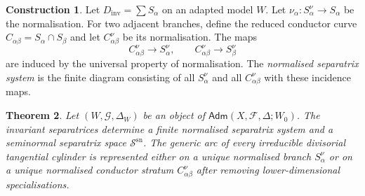 \documentclass[11pt]{amsart}
\numberwithin{equation}{section}
\theoremstyle{plain}
\newtheorem{Theorem}{Theorem}[section]
\theoremstyle{definition}
\newtheorem{Construction}[Theorem]{Construction}
\newcommand{\sn}{\mathrm{sn}}
\newcommand{\Adm}{\mathsf{Adm}}
\newcommand{\Dinv}{D_{\mathrm{inv}}}
\newcommand{\cF}{\mathcal F}
\newcommand{\cG}{\mathcal G}
\newcommand{\sS}{\mathscr S}
\begin{document}
\begin{Construction}
Let $\Dinv=\sum S_\alpha$ on an adapted model $W$.  Let
$
\nu_\alpha:S_\alpha^\nu\to S_\alpha
$
be the normalisation.  For two adjacent branches, define the reduced conductor curve
$
C_{\alpha\beta}=S_\alpha\cap S_\beta
$
and let $C_{\alpha\beta}^\nu$ be its normalisation.  The maps
\[
C_{\alpha\beta}^\nu\to S_\alpha^\nu,
\qquad
C_{\alpha\beta}^\nu\to S_\beta^\nu
\]
are induced by the universal property of normalisation.  The \emph{normalised separatrix system} is the finite diagram consisting of all $S_\alpha^\nu$ and all $C_{\alpha\beta}^\nu$ with these incidence maps.
\end{Construction}



\begin{Theorem}
\label{thm:system-exists}
Let $(W,\cG,\Delta_W)$ be an object of $\Adm(X,\cF,\Delta;W_0)$.  The invariant separatrices determine a finite normalised separatrix system and a seminormal separatrix space $\sS^{\sn}$.  The generic arc of every irreducible divisorial tangential cylinder is represented either on a unique normalised branch $S_\alpha^\nu$ or on a unique normalised conductor stratum $C_{\alpha\beta}^\nu$ after removing lower-dimensional specialisations.
\end{Theorem}
\end{document}
